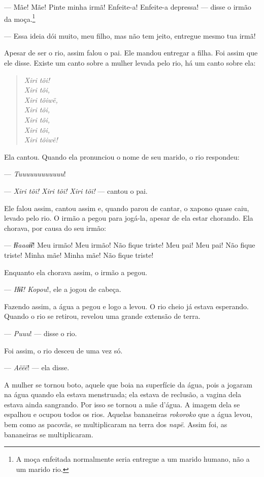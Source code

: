 --- Mãe! Mãe! Pinte minha irmã! Enfeite-a! Enfeite-a depressa! --- disse
o irmão da moça.\footnote{A moça enfeitada normalmente seria entregue a um marido humano, não a um
marido rio.}

--- Essa ideia dói muito, meu filho, mas não tem jeito, entregue mesmo
tua irmã! 

Apesar de ser o rio, assim falou o pai. Ele mandou entregar a filha.
Foi assim que ele disse. Existe um canto sobre a mulher levada pelo rio,
há um canto sobre ela:

\begin{quote}
\textit{Xiri tõi!\\
Xiri tõi,\\
Xiri tõiwë,\\
Xiri tõi,\\
Xiri tõi,\\
Xiri tõi,\\
Xiri tõiwë!}
\end{quote}

Ela cantou. Quando ela pronunciou o nome de seu marido, o rio
respondeu: 

--- \textit{Tuuuuuuuuuuuu}!

--- \textit{Xiri tõi! Xiri tõi! Xiri tõi!} --- cantou o pai. 

Ele falou assim, cantou assim e, quando parou de cantar, o xapono quase
caiu, levado pelo rio. O irmão a pegou para jogá-la, apesar de ela estar
chorando. Ela chorava, por causa do seu irmão: 

--- \textit{Ɨ̃ɨaaaɨ̃ɨ}! Meu irmão! Meu irmão! Não fique triste! Meu pai! Meu
pai! Não fique triste! Minha mãe! Minha mãe! Não fique triste! 

Enquanto ela chorava assim, o irmão a pegou. 

--- \textit{Hɨ̃ɨ! Kopou}!, ele a jogou de cabeça. 

Fazendo assim, a água a pegou e logo a levou. O rio cheio já estava
esperando. Quando o rio se retirou, revelou uma grande extensão de
terra. 

--- \textit{Puuu}! --- disse o rio. 

Foi assim, o rio desceu de uma vez só. 

--- \textit{Aëëë}! --- ela disse. 

A mulher se tornou boto, aquele que boia na superfície da água, pois a
jogaram na água quando ela estava menstruada; ela estava de reclusão, a
vagina dela estava ainda sangrando. Por isso se tornou a mãe d'água. 
A imagem dela se espalhou e ocupou todos os rios. Aquelas
bananeiras \textit{rokoroko} que a água levou, bem como as pacovãs, se
multiplicaram na terra dos \textit{napë}. Assim foi, as bananeiras se
multiplicaram. 

